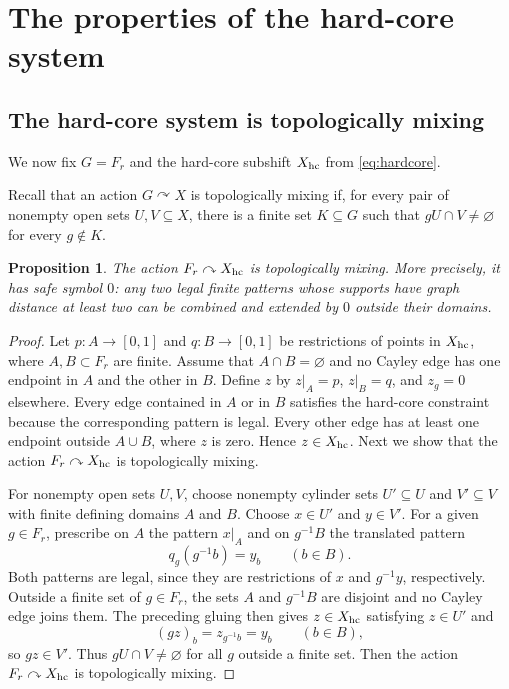 \documentclass[12pt,a4paper]{amsart}
\newtheorem{proposition}[theorem]{Proposition}
\theoremstyle{definition}
\begin{document}
	\section{The properties of the hard-core system}\label{sec3}	\subsection{The hard-core system is topologically mixing}
	
	We now fix $G=F_r$ and the hard-core subshift $X_{\rm hc}$ from \eqref{eq:hardcore}.
	
	Recall that an action $G\curvearrowright X$ is topologically mixing if, for every pair of nonempty open sets $U,V\subseteq X$, there is a finite set $K\subseteq G$ such that $gU\cap V\ne\varnothing$ for every $g\notin K$.
	
	\begin{proposition}\label{prop:mixing}
		The action $F_r\curvearrowright X_{\rm hc}$ is topologically mixing.  More precisely, it has safe symbol $0$: any two legal finite patterns whose supports have graph distance at least two can be combined and extended by $0$ outside their domains.
	\end{proposition}
	
	\begin{proof}
		Let $p:A\to[0,1]$ and $q:B\to[0,1]$ be restrictions of points in $X_{\rm hc}$, where $A,B\subset F_r$ are finite.  Assume that $A\cap B=\varnothing$ and no Cayley edge has one endpoint in $A$ and the other in $B$.  Define $z$ by $z|_A=p$, $z|_B=q$, and $z_g=0$ elsewhere.  Every edge contained in $A$ or in $B$ satisfies the hard-core constraint because the corresponding pattern is legal.  Every other edge has at least one endpoint outside $A\cup B$, where $z$ is zero.  Hence $z\in X_{\rm hc}$. Next we show that the action $F_r\curvearrowright X_{\rm hc}$ is topologically mixing.
		
		For nonempty open sets $U,V$, choose nonempty cylinder sets $U'\subseteq U$ and $V'\subseteq V$ with finite defining domains $A$ and $B$.  Choose $x\in U'$ and $y\in V'$.  For a given $g\in F_r$, prescribe on $A$ the pattern $x|_A$ and on $g^{-1}B$ the translated pattern
		\[
		q_g(g^{-1}b)=y_b\qquad(b\in B).
		\]
		Both patterns are legal, since they are restrictions of $x$ and $g^{-1}y$, respectively.  Outside a finite set of $g\in F_r$, the sets $A$ and $g^{-1}B$ are disjoint and no Cayley edge joins them.  The preceding gluing then gives $z\in X_{\rm hc}$ satisfying $z\in U'$ and
		\[
		(gz)_b=z_{g^{-1}b}=y_b\qquad(b\in B),
		\]
		so $gz\in V'$.  Thus $gU\cap V\ne\varnothing$ for all $g$ outside a finite set. Then the action $F_r\curvearrowright X_{\rm hc}$ is topologically mixing.
	\end{proof}
	
\end{document}
